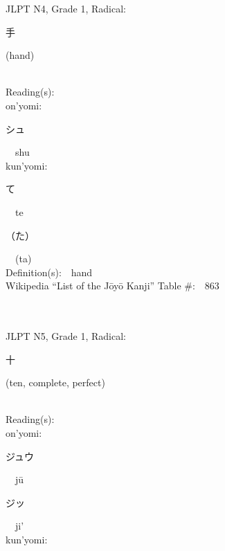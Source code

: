 \begin{multicols}{2}
{JLPT N4, Grade 1, Radical:\ \ {\begin{CJK}{UTF8}{min} 手 \end{CJK}} (hand) } \\
Reading(s):\ \ \\
{\hspace*{1em}}on'yomi:\ \ \\
{\hspace*{2em}}{\begin{CJK}{UTF8}{min} シュ \end{CJK}}\ \ shu\ \ \\
{\hspace*{1em}}kun'yomi:\ \ \\
{\hspace*{2em}}{\begin{CJK}{UTF8}{min} て \end{CJK}}\ \ te\ \ \\
{\hspace*{2em}}{\begin{CJK}{UTF8}{min} （た） \end{CJK}}\ \ (ta)\ \ \\
Definition(s):\ \ hand \\
Wikipedia ``List of the J\=oy\=o Kanji'' Table \#:\ \ 863 \\
\ \ \\
{\fontsize{34pt}{40pt}  }\ \ \\  %
{JLPT N5, Grade 1, Radical:\ \ {\begin{CJK}{UTF8}{min} 十 \end{CJK}} (ten, complete, perfect) } \\
Reading(s):\ \ \\
{\hspace*{1em}}on'yomi:\ \ \\
{\hspace*{2em}}{\begin{CJK}{UTF8}{min} ジュウ \end{CJK}}\ \ j\=u\ \ \\
{\hspace*{2em}}{\begin{CJK}{UTF8}{min} ジッ \end{CJK}}\ \ ji'\ \ \\
{\hspace*{1em}}kun'yomi:\ \ \\

\end{multicols}
